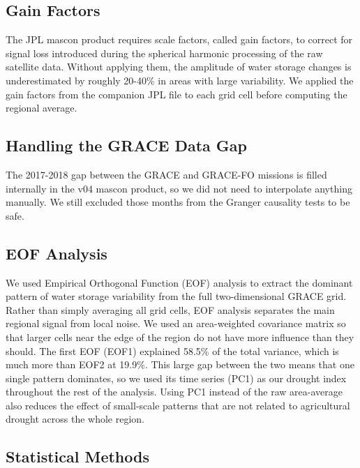 \documentclass[10pt, twocolumn]{article}
\begin{document}
\subsection{Gain Factors}

The JPL mascon product \cite{watkins2015improved} requires scale factors, called gain factors,
to correct for signal loss introduced during the spherical harmonic
processing of the raw satellite data. Without applying them, the
amplitude of water storage changes is underestimated by roughly
20-40\% in areas with large variability. We applied the gain factors
from the companion JPL file to each grid cell before computing the
regional average.

\subsection{Handling the GRACE Data Gap}

The 2017-2018 gap between the GRACE and GRACE-FO missions is filled
internally in the v04 mascon product, so we did not need to
interpolate anything manually. We still excluded those months from
the Granger causality tests to be safe.

\subsection{EOF Analysis}

We used Empirical Orthogonal Function (EOF) analysis to extract
the dominant pattern of water storage variability from the full
two-dimensional GRACE grid. Rather than simply averaging all grid
cells, EOF analysis separates the main regional signal from local
noise. We used an area-weighted covariance matrix so that larger
cells near the edge of the region do not have more influence than
they should. The first EOF (EOF1) explained 58.5\% of the
total variance, which is much more than EOF2 at 19.9\%. This large
gap between the two means that one single pattern dominates, so we
used its time series (PC1) as our drought index throughout the rest
of the analysis. Using PC1 instead of the raw area-average also
reduces the effect of small-scale patterns that are not related to
agricultural drought across the whole region.

\subsection{Statistical Methods}
\end{document}
